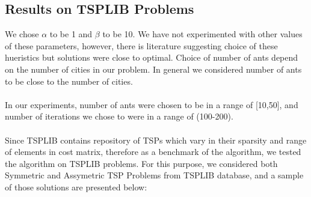 \documentclass[11pt, english]{article}
\begin{document}
\subsection{Results on TSPLIB Problems}
We chose $\alpha$ to be 1 and $\beta$ to be 10. We have not experimented with other values of these parameters, however, there is literature suggesting choice of these hueristics but solutions were close to optimal. Choice of number of ants depend on the number of cities in our problem. In general we considered number of ants to be close to the number of cities. \\ 
\\
In our experiments, number of ants were chosen to be in a range of [10,50], and number of iterations we chose to were in a range of (100-200).\\
\\
Since TSPLIB contains repository of TSPs which vary in their sparsity and range of elements in cost matrix, therefore as a benchmark of the algorithm, we tested the algorithm on TSPLIB problems. For this purpose, we considered both Symmetric and Assymetric TSP Problems from TSPLIB database, and a sample of those solutions are presented below:
\end{document}
